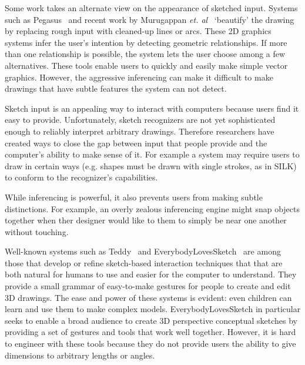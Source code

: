 \documentclass{article}
\begin{document}
Some work takes an alternate view on the appearance of sketched
input. Systems such as Pegasus~\cite{igarashi-pegasus} and recent work
by Murugappan \textit{et. al}~\cite{murugappan-beautification}
`beautify' the drawing by replacing rough input with cleaned-up lines
or arcs. These 2D graphics systems infer the user's intention by
detecting geometric relationships. If more than one relationship is
possible, the system lets the user choose among a few
alternatives. These tools enable users to quickly and easily make
simple vector graphics. However, the aggressive inferencing can make
it difficult to make drawings that have subtle features the system can
not detect.

Sketch input is an appealing way to interact with computers because
users find it easy to provide. Unfortunately, sketch recognizers are
not yet sophisticated enough to reliably interpret arbitrary
drawings. Therefore researchers have created ways to close the gap
between input that people provide and the computer's ability to make
sense of it. For example a system may require users to draw in certain
ways (e.g. shapes must be drawn with single strokes, as in SILK) to
conform to the recognizer's capabilities.

While inferencing is powerful, it also prevents users from making
subtle distinctions. For example, an overly zealous inferencing engine
might snap objects together when ther designer would like to them to
simply be near one another without touching. 

Well-known systems such as Teddy~\cite{igarashi-teddy} and
EverybodyLovesSketch~\cite{bae-everybody} are among those that develop
or refine sketch-based interaction techniques that that are both
natural for humans to use and easier for the computer to understand.
They provide a small grammar of easy-to-make gestures for people to
create and edit 3D drawings. The ease and power of these systems is
evident: even children can learn and use them to make complex
models. EverybodyLovesSketch in particular seeks to enable a broad
audience to create 3D perspective conceptual sketches by providing a
set of gestures and tools that work well together. However, it is hard
to engineer with these tools because they do not provide users the
ability to give dimensions to arbitrary lengths or angles.

\end{document}
